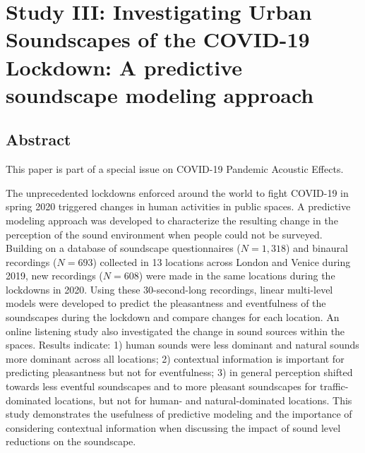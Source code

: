 \chapter[Study III: Soundscapes of the COVID-19 lockdown]{Study III: Investigating Urban Soundscapes of the COVID-19 Lockdown: A predictive soundscape modeling approach}

\section*{Abstract}
This paper is part of a special issue on COVID-19 Pandemic Acoustic Effects.

The unprecedented lockdowns enforced around the world to fight COVID-19 in spring 2020 triggered changes in human activities in public spaces. A predictive modeling approach was developed to characterize the resulting change in the perception of the sound environment when people could not be surveyed. Building on a database of soundscape questionnaires ($N=1,318$) and binaural recordings ($N=693$) collected in 13 locations across London and Venice during 2019, new recordings ($N=608$) were made in the same locations during the lockdowns in 2020. Using these 30-second-long recordings, linear multi-level models were developed to predict the pleasantness and eventfulness of the soundscapes during the lockdown and compare changes for each location. An online listening study also investigated the change in sound sources within the spaces. Results indicate: 1) human sounds were less dominant and natural sounds more dominant across all locations; 2) contextual information is important for predicting pleasantness but not for eventfulness; 3) in general perception shifted towards less eventful soundscapes and to more pleasant soundscapes for traffic-dominated locations, but not for human- and natural-dominated locations. This study demonstrates the usefulness of predictive modeling and the importance of considering contextual information when discussing the impact of sound level reductions on the soundscape.



